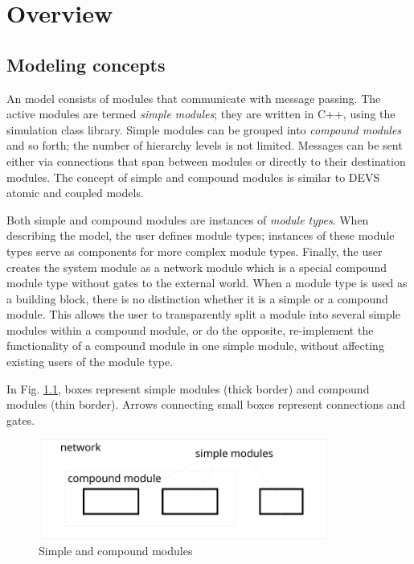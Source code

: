 \chapter{Overview}
\label{cha:overview}


\section{Modeling concepts}

An {\opp} model consists of modules that communicate with message passing.
The active modules are termed \textit{simple modules}; they are written in C++,
using the simulation class library. Simple modules can be grouped into
\textit{compound modules} and so forth; the number of hierarchy levels is not
limited. Messages can be sent either via connections that span between
modules or directly to their destination modules. The concept of simple and
compound modules is similar to DEVS atomic and coupled models.

Both simple and compound modules are instances of \textit{module types}.
When describing the model, the user defines module types; instances of these
module types serve as components for more complex module types. Finally,
the user creates the system module as a network module which is a special
compound module type without gates to the external world. When a module
type is used as a building block, there is no distinction whether it is a
simple or a compound module. This allows the user to transparently split a
module into several simple modules within a compound module, or do the
opposite, re-implement the functionality of a compound module in one simple
module, without affecting existing users of the module type.

In Fig. \ref{fig:ch-overview:modules}, boxes represent simple modules
(thick border) and compound modules (thin border).
Arrows connecting small boxes represent connections and gates.

\begin{figure}[htbp]
\begin{center}
\includegraphics[width=3.772in, height=1.292in]{figures/modules}
\caption{Simple and compound modules}
\label{fig:ch-overview:modules}
\end{center}
\end{figure}


